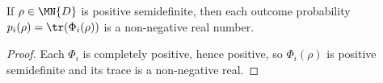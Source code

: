 \begin{theorem}
    \label{thm:instrument_probability_nonneg}
    \leanok
    If $\rho\in\MN{D}$ is positive semidefinite, then each outcome
    probability $p_i(\rho)=\tr(\Phi_i(\rho))$ is a
    non-negative real number.
\end{theorem}

\begin{proof}
    \leanok
    Each $\Phi_i$ is completely positive, hence positive, so
    $\Phi_i(\rho)$ is positive semidefinite and its trace is a
    non-negative real.
\end{proof}

